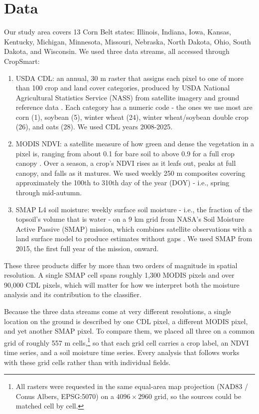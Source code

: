 \documentclass[10pt,letterpaper]{article}
\begin{document}
\section{Data}\label{sec:data}

Our study area covers 13 Corn Belt states: Illinois, Indiana, Iowa, Kansas, Kentucky, Michigan, Minnesota, Missouri, Nebraska, North Dakota, Ohio, South Dakota, and Wisconsin. We used three data streams, all accessed through CropSmart:

\begin{enumerate}

\item USDA CDL: an annual, 30 m raster that assigns each pixel to one of more than 100 crop and land cover categories, produced by USDA National Agricultural Statistics Service (NASS) from satellite imagery and ground reference data \citep{cdl_cropscape}. Each category has a numeric code - the ones we use most are corn (1), soybean (5), winter wheat (24), winter wheat/soybean double crop (26), and oats (28). We used CDL years 2008-2025.

\item MODIS NDVI: a satellite measure of how green and dense the vegetation in a pixel is, ranging from about 0.1 for bare soil to above 0.9 for a full crop canopy \citep{modis_vi_userguide}. Over a season, a crop's NDVI rises as it leafs out, peaks at full canopy, and falls as it matures. We used weekly 250 m composites covering approximately the 100th to 310th day of the year (DOY) - i.e., spring through mid-autumn.

\item SMAP L4 soil moisture: weekly surface soil moisture - i.e., the fraction of the topsoil's volume that is water - on a 9 km grid from NASA's Soil Moisture Active Passive (SMAP) mission, which combines satellite observations with a land surface model to produce estimates without gaps \citep{reichle2017smap}. We used SMAP from 2015, the first full year of the mission, onward.

\end{enumerate}

These three products differ by more than two orders of magnitude in spatial resolution. A single SMAP cell spans roughly 1,300 MODIS pixels and over 90,000 CDL pixels, which will matter for how we interpret both the moisture analysis and its contribution to the classifier.

Because the three data streams come at very different resolutions, a single location on the ground is described by one CDL pixel, a different MODIS pixel, and yet another SMAP pixel. To compare them, we placed all three on a common grid of roughly 557 m cells,\footnote{All rasters were requested in the same equal-area map projection (NAD83 / Conus Albers, EPSG:5070) on a $4096\times2960$ grid, so the sources could be matched cell by cell.} so that each grid cell carries a crop label, an NDVI time series, and a soil moisture time series. Every analysis that follows works with these grid cells rather than with individual fields.
\end{document}
